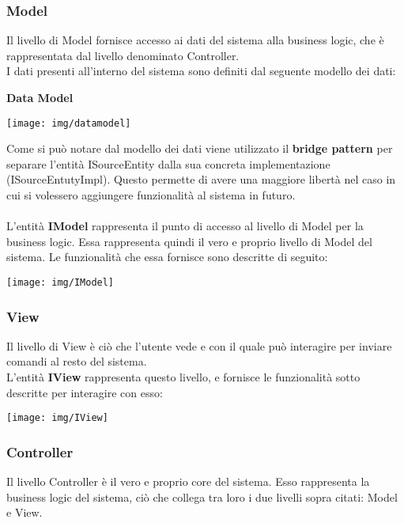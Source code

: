 \documentclass{article}
\begin{document}
  \subsubsection{Model}
  Il livello di Model fornisce accesso ai dati del sistema alla business logic, che è rappresentata dal livello denominato Controller.\\
  I dati presenti all'interno del sistema sono definiti dal seguente modello dei dati:
  \begin{framed}
    \centering
    \textbf{Data Model}
    \begin{center}
      \texttt{[image: img/datamodel]}
    \end{center}
  \end{framed}
  Come si può notare dal modello dei dati viene utilizzato il \textbf{bridge pattern} per separare l'entità ISourceEntity dalla sua concreta
  implementazione (ISourceEntutyImpl). Questo permette di avere una maggiore libertà nel caso in cui si volessero aggiungere funzionalità
  al sistema in futuro.\\
  \\L'entità \textbf{IModel} rappresenta il punto di accesso al livello di Model per la business logic. Essa rappresenta quindi il vero e
  proprio livello di Model del sistema. Le funzionalità che essa fornisce sono descritte di seguito:
  \begin{center}
    \texttt{[image: img/IModel]}
  \end{center}
  \subsubsection{View}
  Il livello di View è ciò che l'utente vede e con il quale può interagire per inviare comandi al resto del sistema.\\
  L'entità \textbf{IView} rappresenta questo livello, e fornisce le funzionalità sotto descritte per interagire con esso:
  \begin{center}
    \texttt{[image: img/IView]}
  \end{center}
  \subsubsection{Controller}
  Il livello Controller è il vero e proprio core del sistema. Esso rappresenta la business logic del sistema, ciò che collega tra loro i due livelli
  sopra citati: Model e View.
\end{document}
